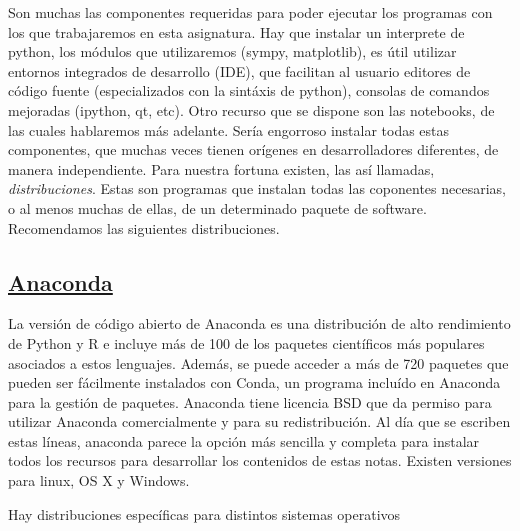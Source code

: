 Son muchas las componentes requeridas para poder ejecutar los programas con los que trabajaremos 
en esta asignatura. Hay que instalar un interprete de python, los módulos que utilizaremos 
(sympy, matplotlib), es útil utilizar entornos integrados de desarrollo (IDE), que facilitan al usuario
editores de código fuente (especializados con la sintáxis de python), consolas de comandos 
mejoradas (ipython, qt, etc). Otro recurso que se dispone son las notebooks, de las cuales 
hablaremos más adelante. Sería engorroso instalar todas estas componentes, que muchas veces 
tienen orígenes en desarrolladores diferentes, de manera independiente. Para nuestra fortuna
existen, las así llamadas, \emph{distribuciones}. Estas son programas que instalan todas 
las coponentes necesarias, o al menos muchas  de ellas, de un determinado paquete de software.
Recomendamos las siguientes distribuciones.  

\subsection{\href{https://www.continuum.io/downloads}{Anaconda}} 
La versión de código abierto de Anaconda es una distribución de alto rendimiento de Python y R 
e incluye más de 100 de los paquetes científicos más populares asociados a estos lenguajes.
Además, se puede acceder a más de 720 paquetes que pueden ser fácilmente instalados con Conda, 
 un programa incluído en Anaconda para la gestión de paquetes.
 Anaconda tiene licencia BSD que da permiso para utilizar Anaconda comercialmente 
 y para su redistribución. Al día que se escriben estas líneas, anaconda parece la opción más 
 sencilla y completa para instalar todos los recursos para desarrollar los contenidos de 
 estas notas. Existen versiones para linux, OS X y Windows. 

 Hay distribuciones específicas para distintos sistemas operativos

